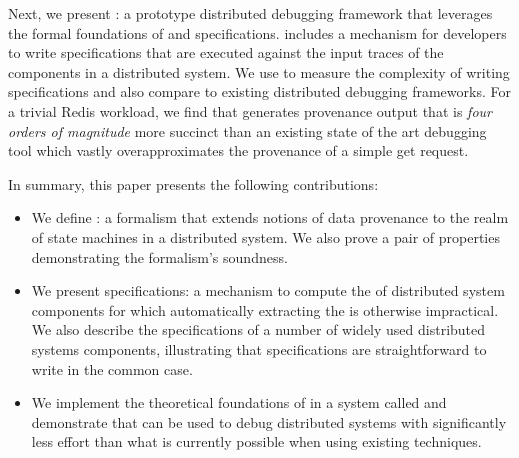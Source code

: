 Next, we present \fluent{}: a prototype distributed debugging framework that
leverages the formal foundations of \watprovenance{} and \watprovenance{}
specifications. \fluent{} includes a mechanism for developers to write
\watprovenance{} specifications that are executed against the input traces of
the components in a distributed system. We use \fluent{} to measure the
complexity of writing \watprovenance{} specifications and also compare
\fluent{} to existing distributed debugging frameworks. For a trivial Redis
workload, we find that \fluent{} generates provenance output that is \emph{four
orders of magnitude} more succinct than an existing state of the art debugging
tool which vastly overapproximates the provenance of a simple get request.

In summary, this paper presents the following contributions:
\begin{itemize}
  \item
    We define \watprovenance{}: a formalism that extends notions of data
    provenance to the realm of state machines in a distributed system. We also
    prove a pair of properties demonstrating the formalism's soundness.
  \item
    We present \watprovenance{} specifications: a mechanism to compute the
    \watprovenance{} of distributed system components for which automatically
    extracting the \watprovenance{} is otherwise impractical. We also describe
    the \watprovenance{} specifications of a number of widely used distributed
    systems components, illustrating that \watprovenance{} specifications are
    straightforward to write in the common case.
  \item
    We implement the theoretical foundations of \watprovenance{} in a system
    called \fluent{} and demonstrate that \fluent{} can be used to debug
    distributed systems with significantly less effort than what is currently
    possible when using existing techniques.
\end{itemize}

